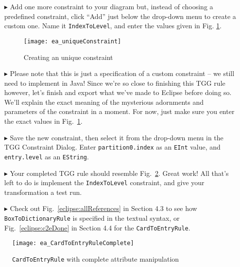 \begin{enumerate}

\item[$\blacktriangleright$] Add one more constraint to your diagram but, instead of choosing a predefined constraint, click ``Add'' just below the
drop-down menu to create a custom one. Name it \texttt{IndexToLevel}, and enter the values given in Fig. \ref{ea:create_new_constraint}.

\begin{figure}[htbp]
\begin{center}
  \texttt{[image: ea\_uniqueConstraint]}
  \caption{Creating an unique constraint}
  \label{ea:create_new_constraint}
\end{center}
\end{figure}
\FloatBarrier

\item[$\blacktriangleright$] Please note that this is just a specification of a custom constraint -- we still need to implement in Java! Since we're so close to
finishing this TGG rule however, let's finish and export what we've made to Eclipse before doing so. We'll explain the exact meaning of the mysterious
adornments and parameters of the constraint in a moment. For now, just make sure you enter the exact values in Fig.~\ref{ea:create_new_constraint}. 

\vspace{0.5cm}

\item[$\blacktriangleright$] Save the new constraint, then select it from the drop-down menu in the TGG Constraint Dialog. Enter \texttt{partition0.index} as an
\texttt{EInt} value, and \texttt{entry.level} as an \texttt{EString}.

\vspace{0.5cm}

\item[$\blacktriangleright$] Your completed TGG rule should resemble Fig.~\ref{ea:cardtoentry_complete}. Great work! All that's left to do is implement the
\texttt{IndexToLevel} constraint, and give your transformation a test run.

\vspace{0.5cm}

\item[$\blacktriangleright$] Check out Fig.~\ref{eclipse:allReferences} in Section 4.3 to see how \texttt{BoxToDictionaryRule} is specified in the textual
syntax, or Fig.~\ref{eclipse:c2eDone} in Section 4.4 for the \texttt{CardToEntryRule}.

\end{enumerate}

\newpage

\vspace*{3cm}

\begin{figure}[htbp]
\begin{center}
  \texttt{[image: ea\_CardToEntryRuleComplete]}
  \caption{\texttt{CardToEntryRule} with complete attribute manipulation}
  \label{ea:cardtoentry_complete}
\end{center}
\end{figure}

